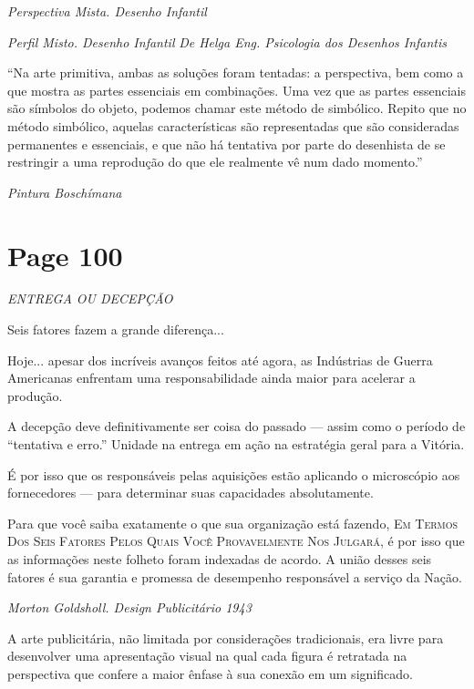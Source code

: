 \documentclass[a4paper]{article}
\begin{document}
\par
\noindent\small\textit{Perspectiva Mista. Desenho Infantil}

\par
\noindent\small\textit{Perfil Misto. Desenho Infantil}
\noindent\small\textit{De Helga Eng. Psicologia dos Desenhos Infantis}

\par
``Na arte primitiva, ambas as soluções foram tentadas: a perspectiva, bem como a que mostra as partes essenciais em combinações. Uma vez que as partes essenciais são símbolos do objeto, podemos chamar este método de simbólico. Repito que no método simbólico, aquelas características são representadas que são consideradas permanentes e essenciais, e que não há tentativa por parte do desenhista de se restringir a uma reprodução do que ele realmente vê num dado momento.''

\par
\noindent\small\textit{Pintura Boschímana}

\vfill
{}

\newpage
\section*{Page 100}

\itshape ENTREGA OU DECEPÇÃO

Seis fatores fazem a grande diferença...

Hoje... apesar dos incríveis avanços feitos até agora, as Indústrias de Guerra Americanas enfrentam uma responsabilidade ainda maior para acelerar a produção.

A decepção deve definitivamente ser coisa do passado --- assim como o período de ``tentativa e erro.'' Unidade na entrega em ação na estratégia geral para a Vitória.

É por isso que os responsáveis pelas aquisições estão aplicando o microscópio aos fornecedores --- para determinar suas capacidades absolutamente.

Para que você saiba exatamente o que sua organização está fazendo, \textsc{Em Termos Dos Seis Fatores Pelos Quais Você Provavelmente Nos Julgará}, é por isso que as informações neste folheto foram indexadas de acordo. A união desses seis fatores é sua garantia e promessa de desempenho responsável a serviço da Nação.

{\large\itshape Morton Goldsholl. Design Publicitário 1943}

A arte publicitária, não limitada por considerações tradicionais, era livre para desenvolver uma apresentação visual na qual cada figura é retratada na perspectiva que confere a maior ênfase à sua conexão em um significado.
\end{document}
